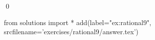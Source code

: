 
\begin{ex} 
  \label{ex:rational9}
  
  \qed
\end{ex} 
\begin{python0}
from solutions import *
add(label="ex:rational9",
    srcfilename='exercises/rational9/answer.tex') 
\end{python0}
